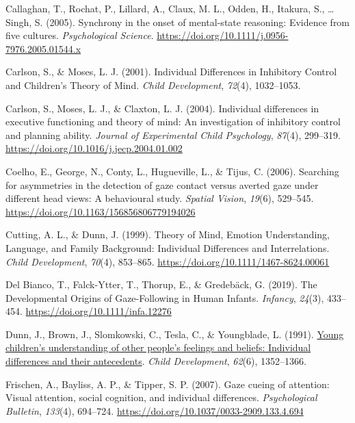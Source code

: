 \documentclass[
  man,floatsintext]{apa6}
\newlength{\cslhangindent}
\newlength{\cslentryspacingunit} %
\newenvironment{CSLReferences}[2] %
 {%
  \setlength{\parindent}{0pt}
  \ifodd #1
  \let\oldpar\par
  \def\par{\hangindent=\cslhangindent\oldpar}
  \fi
  \setlength{\parskip}{#2\cslentryspacingunit}
 }%
 {}
\begin{document}
\begin{CSLReferences}{1}{0}
\leavevmode{}%
Callaghan, T., Rochat, P., Lillard, A., Claux, M. L., Odden, H., Itakura, S., \ldots{} Singh, S. (2005). Synchrony in the onset of mental-state reasoning: {Evidence} from five cultures. \emph{Psychological Science}. \url{https://doi.org/10.1111/j.0956-7976.2005.01544.x}

\leavevmode{}%
Carlson, S., \& Moses, L. J. (2001). Individual {Differences} in {Inhibitory Control} and {Children}'s {Theory} of {Mind}. \emph{Child Development}, \emph{72}(4), 1032--1053.

\leavevmode{}%
Carlson, S., Moses, L. J., \& Claxton, L. J. (2004). Individual differences in executive functioning and theory of mind: {An} investigation of inhibitory control and planning ability. \emph{Journal of Experimental Child Psychology}, \emph{87}(4), 299--319. \url{https://doi.org/10.1016/j.jecp.2004.01.002}

\leavevmode{}%
Coelho, E., George, N., Conty, L., Hugueville, L., \& Tijus, C. (2006). Searching for asymmetries in the detection of gaze contact versus averted gaze under different head views: A behavioural study. \emph{Spatial Vision}, \emph{19}(6), 529--545. \url{https://doi.org/10.1163/156856806779194026}

\leavevmode{}%
Cutting, A. L., \& Dunn, J. (1999). Theory of {Mind}, {Emotion Understanding}, {Language}, and {Family Background}: {Individual Differences} and {Interrelations}. \emph{Child Development}, \emph{70}(4), 853--865. \url{https://doi.org/10.1111/1467-8624.00061}

\leavevmode{}%
Del Bianco, T., Falck-Ytter, T., Thorup, E., \& Gredebäck, G. (2019). The {Developmental Origins} of {Gaze-Following} in {Human Infants}. \emph{Infancy}, \emph{24}(3), 433--454. \url{https://doi.org/10.1111/infa.12276}

\leavevmode{}%
Dunn, J., Brown, J., Slomkowski, C., Tesla, C., \& Youngblade, L. (1991). \href{https://www.ncbi.nlm.nih.gov/pubmed/1786720}{Young children's understanding of other people's feelings and beliefs: Individual differences and their antecedents}. \emph{Child Development}, \emph{62}(6), 1352--1366.

\leavevmode{}%
Frischen, A., Bayliss, A. P., \& Tipper, S. P. (2007). Gaze cueing of attention: {Visual} attention, social cognition, and individual differences. \emph{Psychological Bulletin}, \emph{133}(4), 694--724. \url{https://doi.org/10.1037/0033-2909.133.4.694}


\end{CSLReferences}
\end{document}
